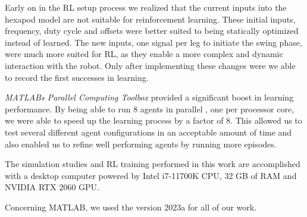 Early on in the RL setup process we realized that the current inputs into the hexapod model are not suitable for reinforcement learning.
These initial inputs, frequency, duty cycle and offsets were better suited to being statically optimized instead of learned.
The new inputs, one signal per leg to initiate the swing phase, were much more suited for RL, as they enable a more complex and dynamic interaction with the robot.
Only after implementing these changes were we able to record the first successes in learning.


\textit{MATLABs Parallel Computing Toolbox} provided a significant boost in learning performance.
By being able to run 8 agents in parallel , one per processor core, we were able to speed up the learning process by a factor of 8.
This allowed us to test several different agent configurations in an acceptable amount of time and also enabled us to refine well performing agents by running more episodes.

The simulation studies and RL training performed in this work are accomplished with a desktop computer powered by Intel i7-11700K CPU, 32 GB of RAM and NVIDIA RTX 2060 GPU.

Concerning MATLAB, we used the version 2023a for all of our work.


